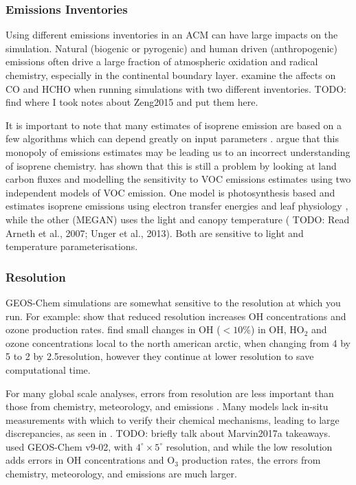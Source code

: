     
    \subsubsection{Emissions Inventories}
      Using different emissions inventories in an ACM can have large impacts on the simulation.
      Natural (biogenic or pyrogenic) and human driven (anthropogenic) emissions often drive a large fraction of atmospheric oxidation and radical chemistry, especially in the continental boundary layer.
      \textcite{Zeng2015} examine the affects on CO and HCHO when running simulations with two different inventories.
      TODO: find where I took notes about Zeng2015 and put them here.
      
      It is important to note that many estimates of isoprene emission are based on a few algorithms which can depend greatly on input parameters \parencite{Arneth2008,Niinemets2010}.
      \textcite{Arneth2008} argue that this monopoly of emissions estimates may be leading us to an incorrect understanding of isoprene chemistry.
      \textcite{Yue2015} has shown that this is still a problem by looking at land carbon fluxes and modelling the sensitivity to VOC emissions estimates using two independent models of VOC emission.
      One model is photosynthesis based and estimates isoprene emissions using electron transfer energies and leaf physiology \parencite{Niinemets1999}, while the other (MEGAN) uses the light and canopy temperature (\parencite{Guenther1995,Arneth2007} TODO: Read Arneth et al., 2007; Unger et al., 2013).
      Both are sensitive to light and temperature parameterisations.
    
      
    \subsubsection{Resolution}
      \label{LR:Models:Uncert:Resolution}
      GEOS-Chem simulations are somewhat sensitive to the resolution at which you run.
      For example: \textcite{Wild2006} show that reduced resolution increases OH concentrations and ozone production rates.
      \textcite{Christian2017} find small changes in OH ($<10$\%) in OH, HO$_2$ and ozone concentrations local to the north american arctic, when changing from 4 by 5 to 2 by 2.5\degr resolution, however they continue at lower resolution to save computational time.
    
      For many global scale analyses, errors from resolution are less important than those from chemistry, meteorology, and emissions \parencite{Christian2017}.
      Many models lack in-situ measurements with which to verify their chemical mechanisms, leading to large discrepancies, as seen in \textcite{Marvin2017a}.
      TODO: briefly talk about Marvin2017a takeaways.
      \textcite{Christian2017} used GEOS-Chem v9-02, with $4^{\circ} \times 5^{\circ}$ resolution, and while the low resolution adds errors in OH concentrations and O$_3$ production rates, the errors from chemistry, meteorology, and emissions are much larger.
            
